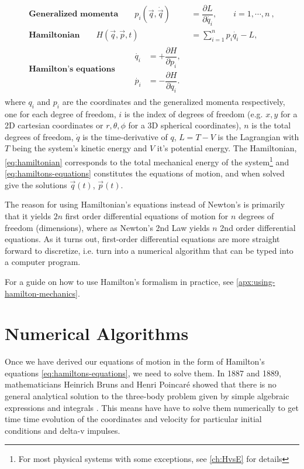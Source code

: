 \begin{align}
\textbf{Generalized momenta} \qquad p_i(\vec{q},\dot{\vec{q}}) &= \dfrac{\partial L}{\partial \dot{q_i}}, \qquad i = 1,\cdots, n \ , \label{eq:generalized-momenta} \\[1cm]
\textbf{Hamiltonian} \qquad H(\vec{q}, \vec{p}, t) &= \sum\limits_{i=1}^n p_i \dot{q_i} - L \label{eq:hamiltonian}, \\[1cm]
\textbf{Hamilton's equations} \qquad
\begin{split}
\label{eq:hamiltons-equations}
\dot{q_i} &= +\dfrac{\partial H}{\partial p_i} ,
\\[0.2cm]
\dot{p_i} &= -\dfrac{\partial H}{\partial q_i}.
\end{split}
\end{align}
where $q_i$ and $p_i$ are the coordinates and the generalized momenta respectively, one for each degree of freedom, $i$ is the index of degrees of freedom (e.g. $x, y$ for a 2D cartesian coordinates or  $r, \theta, \phi$ for a 3D spherical coordinates), $n$ is the total degrees of freedom, $\dot{q}$ is the time-derivative of $q$, $L = T - V$ is the Lagrangian with $T$ being the system's kinetic energy and $V$ it's potential energy. The Hamiltonian, \cref{eq:hamiltonian} corresponds to the total mechanical energy of the system\footnote{For most physical systems with some exceptions, see \cref{ch:HvsE} for details} and \cref{eq:hamiltons-equations} constitutes the equations of motion, and when solved give the solutions $\vec{q}(t)$, $\vec{p}(t)$.

The reason for using Hamiltonian's equations instead of Newton's is primarily that it yields $2 n$ first order differential equations of motion for $n$ degrees of freedom (dimensions), where as Newton's 2nd Law yields $n$ 2nd order differential equations. As it turns out, first-order differential equations are more straight forward to discretize, i.e. turn into a numerical algorithm that can be typed into a computer program.

For a guide on how to use Hamilton's formalism in practice, see \cref{apx:using-hamilton-mechanics}.

\section{Numerical Algorithms}
Once we have derived our equations of motion in the form of Hamilton's equations \cref{eq:hamiltons-equations}, we need to solve them. In 1887 and 1889, mathematicians Heinrich Bruns and Henri Poincaré showed that there is no general analytical solution to the three-body problem given by simple algebraic expressions and integrals \cite{Gowers2008}. This means have have to solve them numerically to get time time evolution of the coordinates and velocity for particular initial conditions and delta-v impulses.

